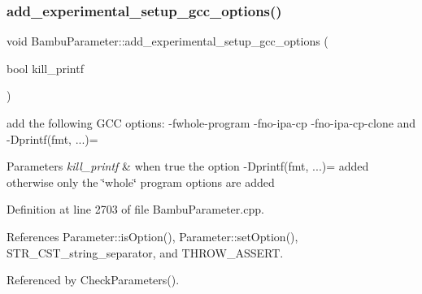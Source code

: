 \subsubsection{\texorpdfstring{add\+\_\+experimental\+\_\+setup\+\_\+gcc\+\_\+options()}{add\_experimental\_setup\_gcc\_options()}}
{\footnotesize\ttfamily void Bambu\+Parameter\+::add\+\_\+experimental\+\_\+setup\+\_\+gcc\+\_\+options (\begin{DoxyParamCaption}\item[{bool}]{kill\+\_\+printf }\end{DoxyParamCaption})\hspace{0.3cm}{\ttfamily [private]}}



add the following G\+CC options\+: -\/fwhole-\/program -\/fno-\/ipa-\/cp -\/fno-\/ipa-\/cp-\/clone and -\/D\textquotesingle{}printf(fmt, ...)=\textquotesingle{} 


\begin{DoxyParams}{Parameters}
{\em kill\+\_\+printf} & when true the option -\/D\textquotesingle{}printf(fmt, ...)=\textquotesingle{} added otherwise only the \char`\"{}whole\char`\"{} program options are added \\
\hline
\end{DoxyParams}


Definition at line 2703 of file Bambu\+Parameter.\+cpp.



References Parameter\+::is\+Option(), Parameter\+::set\+Option(), S\+T\+R\+\_\+\+C\+S\+T\+\_\+string\+\_\+separator, and T\+H\+R\+O\+W\+\_\+\+A\+S\+S\+E\+RT.



Referenced by Check\+Parameters().


